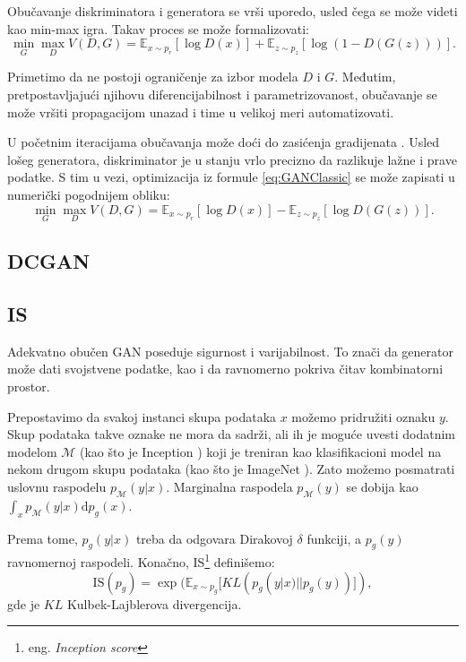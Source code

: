 \documentclass[12pt, a4paper]{article}
\begin{document}
	Obučavanje diskriminatora i generatora se vrši uporedo, usled čega se može videti kao min-max igra. Takav proces se može formalizovati:
	\begin{equation}
	\min_{G}\max_{D}V(D, G) = \mathbb{E}_{x \sim p_r}[\log D(x)] + \mathbb{E}_{z \sim p_z}[\log(1 - D(G(z)))].
	\label{eq:GANClassic}
	\end{equation}
	
	Primetimo da ne postoji ograničenje za izbor modela $D$ i $G$. Međutim, pretpostavljajući njihovu diferencijabilnost i parametrizovanost, obučavanje se može vršiti propagacijom unazad i time u velikoj meri automatizovati.
	
	U početnim iteracijama obučavanja može doći do zasićenja gradijenata \cite{GAN-2014}. Usled lošeg generatora, diskriminator je u stanju vrlo precizno da razlikuje lažne i prave podatke. S tim u vezi, optimizacija iz formule \ref{eq:GANClassic} se može zapisati u numerički pogodnijem obliku:
	\begin{equation}
	\min_{G}\max_{D}V(D, G) = \mathbb{E}_{x \sim p_r}[\log D(x)] - \mathbb{E}_{z \sim p_z}[\log D(G(z))].
	\end{equation}

\subsection{DCGAN}

\subsection{IS}
Adekvatno obučen GAN poseduje sigurnost i varijabilnost. To znači da generator može dati svojstvene podatke, kao i da ravnomerno pokriva čitav kombinatorni prostor.

Prepostavimo da svakoj instanci skupa podataka $x$ možemo pridružiti oznaku $y$. Skup podataka takve oznake ne mora da sadrži, ali ih je moguće uvesti dodatnim modelom $\mathcal{M}$ (kao što je Inception \cite{Inception-2014}) koji je treniran kao klasifikacioni model na nekom drugom skupu podataka (kao što je ImageNet \cite{ImageNet-2014}). Zato možemo posmatrati uslovnu raspodelu $p_{\mathcal{M}}(y|x)$. Marginalna raspodela $p_{\mathcal{M}}(y)$ se dobija kao $\int_{x}p_{\mathcal{M}}(y|x)\text{d}p_g(x)$.

Prema tome, $p_g(y|x)$ treba da odgovara Dirakovoj $\delta$ funkciji, a $p_g(y)$ ravnomernoj raspodeli. Konačno, IS\footnote{eng. \textit{Inception score}} definišemo:
\begin{equation}
\text{IS}(p_g) = \exp(\mathbb{E}_{x \sim p_g}[KL(p_g(y|x)||p_g(y))]),
\end{equation}
gde je $KL$ Kulbek-Lajblerova divergencija.
\end{document}

